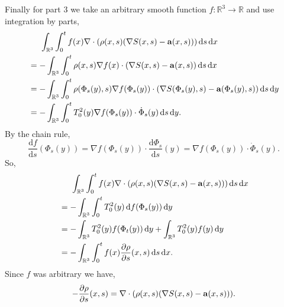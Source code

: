 \documentclass[a4paper,12pt,draft]{report}
\theoremstyle{remark}
\theoremstyle{definition}
\begin{document}
{Finally for part 3 we take an arbitrary smooth function $f: \mathbb{R}^3 \to \mathbb{R}$ and use integration by parts,
\begin{align}
& \hspace{0.5cm} \int_{\mathbb{R}^3}\int_0^tf(x)\nabla\cdot(\rho(x, s)(\nabla S(x, s) - \bold{a}(x, s)))\,\mathrm{d}s\,\mathrm{d}x\nonumber\\
& = - \int_{\mathbb{R}^3}\int_0^t\rho(x, s)\nabla f(x)\cdot(\nabla S(x, s) - \bold{a}(x, s))\,\mathrm{d}s\,\mathrm{d}x\nonumber\\
& = - \int_{\mathbb{R}^3}\int_0^t\rho(\Phi_s(y), s)\nabla f(\Phi_s(y))\cdot(\nabla S(\Phi_s(y), s) - \bold{a}(\Phi_s(y), s))\,\mathrm{d}s\,\mathrm{d}y\nonumber\\
& = - \int_{\mathbb{R}^3}\int_0^tT_0^2(y)\nabla f(\Phi_s(y))\cdot\dot{\Phi}_s(y)\,\mathrm{d}s\,\mathrm{d}y.\nonumber
\end{align}
By the chain rule,
$$
\frac{\mathrm{d}f}{\mathrm{d}s}(\Phi_s(y)) = \nabla f(\Phi_s(y))\cdot\frac{\mathrm{d}\Phi_s}{\mathrm{d}s}(y) = \nabla f(\Phi_s(y))\cdot\dot{\Phi}_s(y).
$$
So,
\begin{align}
& \hspace{0.5cm} \int_{\mathbb{R}^3}\int_0^tf(x)\nabla\cdot(\rho(x, s)(\nabla S(x, s) - \bold{a}(x, s)))\,\mathrm{d}s\,\mathrm{d}x\nonumber\\
& = - \int_{\mathbb{R}^3}\int_0^tT_0^2(y)\,\mathrm{d}f(\Phi_s(y))\,\mathrm{d}y\nonumber\\
& = - \int_{\mathbb{R}^3}T_0^2(y)f(\Phi_t(y))\,\mathrm{d}y + \int_{\mathbb{R}^3}T_0^2(y)f(y)\,\mathrm{d}y\nonumber\\
& = - \int_{\mathbb{R}^3}\int_0^tf(x)\frac{\partial\rho}{\partial s}(x, s)\,\mathrm{d}s\,\mathrm{d}x.\nonumber
\end{align}
Since $f$ was arbitrary we have,
$$
-\frac{\partial\rho}{\partial s}(x, s) = \nabla\cdot(\rho(x, s)(\nabla S(x, s) - \bold{a}(x, s))).
$$

\qedhere
}
\end{document}
